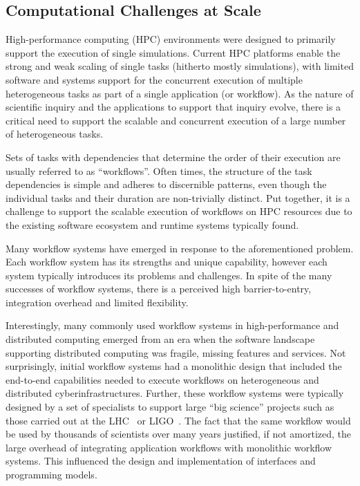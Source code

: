 \documentclass{bmcart}
\begin{document}

\subsection*{Computational Challenges at Scale}\label{ssec:CC}

High-performance computing (HPC) environments were designed to primarily
support the execution of single simulations. Current HPC platforms enable the
strong and weak scaling of single tasks (hitherto mostly simulations), with
limited software and systems support for the concurrent execution of multiple
heterogeneous tasks as part of a single application (or workflow). As the
nature of scientific inquiry and the applications to support that inquiry
evolve, there is a critical need to support the scalable and concurrent
execution of a large number of heterogeneous tasks.

Sets of tasks with dependencies that determine the order of their execution
are usually referred to as ``workflows''. Often times, the structure of the
task dependencies is simple and adheres to discernible patterns, even though
the individual tasks and their duration are non-trivially distinct. Put
together, it is a challenge to support the scalable execution of workflows on
HPC resources due to the existing software ecosystem and runtime systems
typically found.

Many workflow systems have emerged in response to the aforementioned problem.
Each workflow system has its strengths and unique capability, however each
system typically introduces its problems and challenges. In spite of the many
successes of workflow systems, there is a perceived high barrier-to-entry,
integration overhead and limited flexibility.

Interestingly, many commonly used workflow systems in high-performance and
distributed computing emerged from an era when the software landscape
supporting distributed computing was fragile, missing features and services.
Not surprisingly, initial workflow systems had a monolithic design that
included the end-to-end capabilities needed to execute workflows on
heterogeneous and distributed cyberinfrastructures. Further, these workflow
systems were typically designed by a set of specialists to support large
``big science'' projects such as those carried out at the
LHC~\cite{breskin2009cern} or LIGO~\cite{althouse1992ligo}. The fact that the
same workflow would be used by thousands of scientists over many years
justified, if not amortized, the large overhead of integrating application
workflows with monolithic workflow systems. This influenced the design and
implementation of interfaces and programming models.
\end{document}
